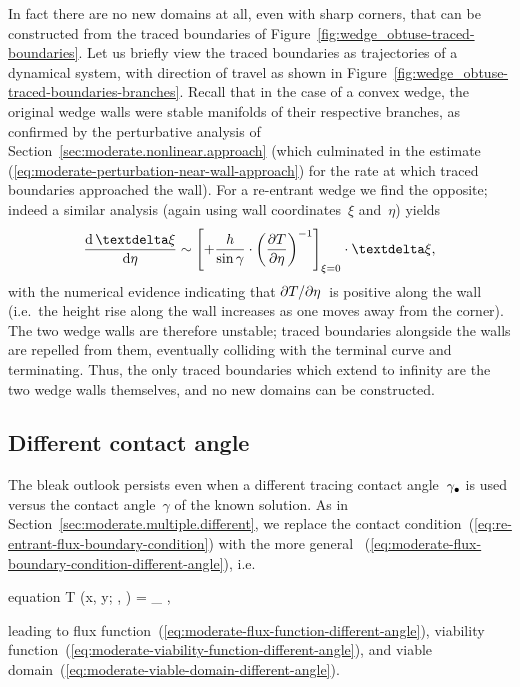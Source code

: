 In fact there are no new domains at all,
even with sharp corners,
that can be constructed from the traced boundaries
of Figure~\ref{fig:wedge_obtuse-traced-boundaries}.
Let us briefly view the traced boundaries
as trajectories of a dynamical system,
with direction of travel as shown in
Figure~\ref{fig:wedge_obtuse-traced-boundaries-branches}.
Recall that in the case of a convex wedge,
the original wedge walls were stable manifolds of their respective branches,
as confirmed by the perturbative analysis
of Section~\ref{sec:moderate.nonlinear.approach}
(which culminated in the estimate~%
  (\ref{eq:moderate-perturbation-near-wall-approach})
for the rate at which traced boundaries approached the wall).
For a re-entrant wedge we find the opposite;
indeed a similar analysis
(again using wall coordinates~$\xi$ and~$\eta$)
yields
\begin{equation}
  \tder{\vd\xi}{\eta} \asy
    \squarebr*{
      +\frac{h}{\sin\gamma} \cdot \roundbr*{\pder{T}{\eta}}^{-1}
    }_{\xi=0}
      \cdot \vd\xi,
  \label{eq:re-entrant-perturbation-near-wall-repulsion}
\end{equation}
with the numerical evidence indicating that
$\mathop{}\!\partial T / {\mathop{}\!\partial\eta}$~is positive along the wall
(i.e.~the height rise along the wall increases
as one moves away from the corner).
The two wedge walls are therefore unstable;
traced boundaries alongside the walls are repelled from them,
eventually colliding with the terminal curve and terminating.
Thus, the only traced boundaries which extend to infinity
are the two wedge walls themselves,
and no new domains can be constructed.

\subsection{Different contact angle}
\label{sec:re-entrant.rounding.different}

The bleak outlook persists
even when a different tracing contact angle~$\gamma_\bullet$ is used
versus the contact angle~$\gamma$ of the known solution.
As in Section~\ref{sec:moderate.multiple.different},
we replace the contact condition~(\ref{eq:re-entrant-flux-boundary-condition})
with the more general~%
  (\ref{eq:moderate-flux-boundary-condition-different-angle}),
i.e.
\begin{important}{equation}
  \normalvec \dotp \del T (x, y; \alpha, \gamma) =
    \cos\gamma_\tr
    ,
  \label{eq:re-entrant-flux-boundary-condition-different-angle}
\end{important}
leading to flux function~(\ref{eq:moderate-flux-function-different-angle}),
viability function~(\ref{eq:moderate-viability-function-different-angle}),
and viable domain~(\ref{eq:moderate-viable-domain-different-angle}).

